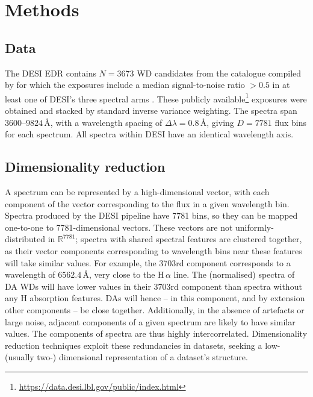 \documentclass[fleqn,usenatbib]{mnras}
\begin{document}
\section{Methods}
\label{sec:methods}

\subsection{Data}

The DESI EDR contains $N=3673$ WD candidates from the catalogue compiled by \citet{gentilefusillo19} for which the exposures include a median signal-to-noise ratio $>0.5$ in at least one of DESI's three spectral arms \citep{manser24}.
These publicly available\footnote{
    \url{https://data.desi.lbl.gov/public/index.html}
} exposures were obtained and stacked by standard inverse variance weighting.
The spectra span $3600$--$9824\,\text{\AA}$, with a wavelength spacing of $\Delta \lambda = 0.8\,\text{\AA}$, giving $D=7781$ flux bins for each spectrum.
All spectra within DESI have an identical wavelength axis.

\subsection{Dimensionality reduction}

A spectrum can be represented by a high-dimensional vector, with each component of the vector corresponding to the flux in a given wavelength bin.
Spectra produced by the DESI pipeline have 7781 bins, so they can be mapped one-to-one to 7781-dimensional vectors.
These vectors are not uniformly-distributed in $\mathbb{R}^{7781}$;
spectra with shared spectral features are clustered together, as their vector components corresponding to wavelength bins near these features will take similar values.
For example, the 3703rd component corresponds to a wavelength of $6562.4\,\text{\AA}$, very close to the H$\,\alpha$ line.
The (normalised) spectra of DA WDs will have lower values in their 3703rd component than spectra without any H absorption features.
DAs will hence -- in this component, and by extension other components -- be close together.
Additionally, in the absence of artefacts or large noise, adjacent components of a given spectrum are likely to have similar values.
The components of spectra are thus highly intercorrelated.
Dimensionality reduction techniques exploit these redundancies in datasets, seeking a low- (usually two-) dimensional representation of a dataset's structure.
\end{document}
